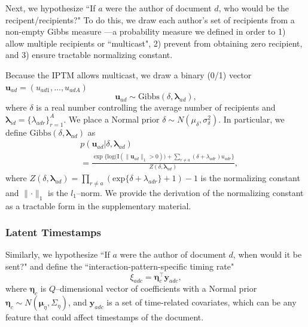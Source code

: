 \documentclass{article}
\begin{document}
Next, we hypothesize ``If $a$ were the
author of document $d$, who would be the recipent/recipients?" To do this, we draw each author's set of recipients from a non-empty Gibbs measure \cite{fellows2017removing}---a probability measure we defined in order to 1) allow multiple recipients or ``multicast", 2) prevent from obtaining zero recipient, and 3) ensure tractable normalizing constant. 

Because the IPTM allows multicast, we draw a binary (0/1) vector $\boldsymbol{u}_{ad}= (u_{ad1},
	\ldots, u_{adA})$
	\begin{equation} \boldsymbol{u}_{ad}  \sim
	\mbox{Gibbs}(\delta, \boldsymbol{\lambda}_{ad}),
	\end{equation}
where $\delta$ is a real number controlling the average number of recipients and $\boldsymbol{\lambda}_{id}= \{\lambda_{adr}\}_{r=1}^A$. We place a Normal prior $\delta \sim N(\mu_\delta,\sigma^2_\delta)$. In particular, we define $\mbox{Gibbs}(\delta, \boldsymbol{\lambda}_{ad})$ as
\begin{equation}
\begin{aligned}
&p(\boldsymbol{u}_{ad}|\delta, \boldsymbol{\lambda}_{ad}) \\&= \frac{\exp\Big\{\mbox{log}\big(\text{I}( \lVert \boldsymbol{u}_{ad}\rVert_1 > 0 )\big) + \sum_{r\neq a} (\delta+\lambda_{adr})u_{adr}\Big\}}{Z(\delta,\boldsymbol{\lambda}_{ad})} ,
\end{aligned}
\label{eqn:Gibbs}
\end{equation}
where $Z(\delta,\boldsymbol{\lambda}_{ad})= \prod_{r \neq a} (\mbox{exp}\{\delta+\lambda_{adr}\} + 1)-1$ is the normalizing constant and $\lVert \cdot \rVert_1$ is the $l_1$--norm. We provide the derivation of the normalizing constant as a tractable form in the supplementary material. 

\subsubsection{Latent Timestamps}\label{subsubsec:Hypothetical Timestamps}
Similarly, we hypothesize ``If $a$ were the author of document $d$, when would it be sent?" and define the ``interaction-pattern-specific timing rate"
\begin{equation}
\xi_{adc} = \boldsymbol{\eta}_c^\top \boldsymbol{y}_{adc},
\end{equation}
where $\boldsymbol{\eta}_c$ is $Q$--dimensional vector of coefficients with a Normal prior $\boldsymbol{\eta}_c \sim N(\boldsymbol{\mu}_\eta,\Sigma_\eta)$, and $\boldsymbol{y}_{adc}$ is a set of time-related covariates, which can be any feature that could affect timestamps of the document. 
\end{document}
